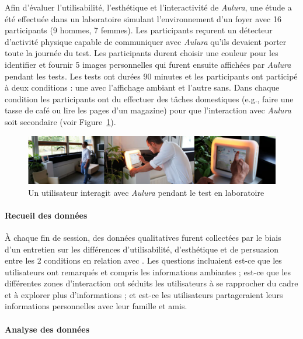 \documentclass[10pt,a5paper,twoside]{article}
\begin{document}
Afin d'évaluer l'utilisabilité, l'esthétique et l'interactivité de
\emph{Aulura}, une étude a été effectuée dans un laboratoire simulant
l'environnement d'un foyer avec 16 participants (9 hommes, 7 femmes).
Les participants reçurent un détecteur d'activité physique capable de
communiquer avec \emph{Aulura} qu'ils devaient porter toute la journée
du test. Les participants durent choisir une couleur pour les identifier
et fournir 5 images personnelles qui furent ensuite affichées par
\emph{Aulura} pendant les tests. Les tests ont durées 90 minutes et les
participants ont participé à deux conditions : une avec l'affichage
ambiant et l'autre sans. Dans chaque condition les participants ont du
effectuer des tâches domestiques (e.g., faire une tasse de café ou lire
les pages d'un magazine) pour que l'interaction avec \emph{Aulura} soit
secondaire (voir Figure~\ref{fig:aulura3}).

\begin{figure}
\centering
\includegraphics[width=0.900\hsize]{images/Aulura-screenshot1.png}
\caption{Un utilisateur interagit avec \emph{Aulura} pendant le test en
laboratoire}\label{fig:aulura3}
\end{figure}

\paragraph{Recueil des données}\label{recueil-des-donnuxe9es-2}

À chaque fin de session, des données qualitatives furent collectées par
le biais d'un entretien sur les différences d'utilisabilité,
d'esthétique et de persuasion entre les 2 conditions en relation avec .
Les questions incluaient est-ce que les utilisateurs ont remarqués et
compris les informations ambiantes ; est-ce que les différentes zones
d'interaction ont séduits les utilisateurs à se rapprocher du cadre et à
explorer plus d'informations ; et est-ce les utilisateurs partageraient
leurs informations personnelles avec leur famille et amis.

\paragraph{Analyse des données}\label{analyse-des-donnuxe9es-1}
\end{document}
